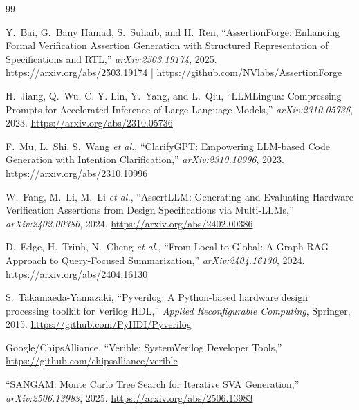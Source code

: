 \documentclass[12pt,a4paper]{article}
\begin{document}
\begin{thebibliography}{99}

Y.~Bai, G.~Bany Hamad, S.~Suhaib, and H.~Ren,
``AssertionForge: Enhancing Formal Verification Assertion Generation with
Structured Representation of Specifications and RTL,''
\textit{arXiv:2503.19174}, 2025.
\newline \url{https://arxiv.org/abs/2503.19174} |
\url{https://github.com/NVlabs/AssertionForge}

H.~Jiang, Q.~Wu, C.-Y. Lin, Y.~Yang, and L.~Qiu,
``LLMLingua: Compressing Prompts for Accelerated Inference of Large Language
Models,''
\textit{arXiv:2310.05736}, 2023.
\newline \url{https://arxiv.org/abs/2310.05736}

F.~Mu, L.~Shi, S.~Wang \textit{et al.},
``ClarifyGPT: Empowering LLM-based Code Generation with Intention
Clarification,''
\textit{arXiv:2310.10996}, 2023.
\newline \url{https://arxiv.org/abs/2310.10996}

W.~Fang, M.~Li, M.~Li \textit{et al.},
``AssertLLM: Generating and Evaluating Hardware Verification Assertions from
Design Specifications via Multi-LLMs,''
\textit{arXiv:2402.00386}, 2024.
\newline \url{https://arxiv.org/abs/2402.00386}

D.~Edge, H.~Trinh, N.~Cheng \textit{et al.},
``From Local to Global: A Graph RAG Approach to Query-Focused Summarization,''
\textit{arXiv:2404.16130}, 2024.
\newline \url{https://arxiv.org/abs/2404.16130}

S.~Takamaeda-Yamazaki,
``Pyverilog: A Python-based hardware design processing toolkit for Verilog
HDL,''
\textit{Applied Reconfigurable Computing}, Springer, 2015.
\newline \url{https://github.com/PyHDI/Pyverilog}

Google/ChipsAlliance,
``Verible: SystemVerilog Developer Tools,''
\url{https://github.com/chipsalliance/verible}

``SANGAM: Monte Carlo Tree Search for Iterative SVA Generation,''
\textit{arXiv:2506.13983}, 2025.
\newline \url{https://arxiv.org/abs/2506.13983}


\end{thebibliography}
\end{document}
